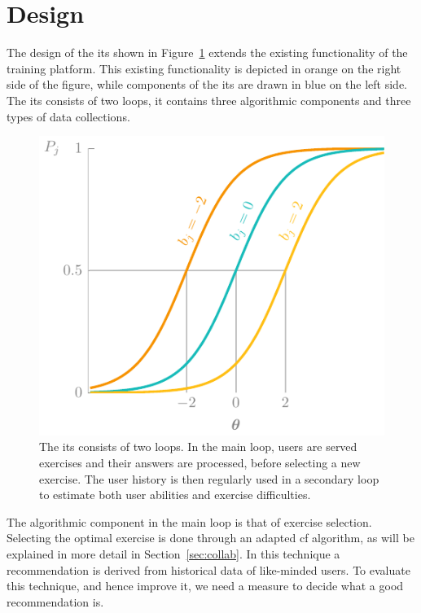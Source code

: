 \section{Design}
\label{sec:design}
The design of the \gls{its} shown in Figure~\ref{fig:its-overview} extends the existing functionality of the training platform.
This existing functionality is depicted in orange on the right side of the figure, while components of the \gls{its} are drawn in blue on the left side.
The \gls{its} consists of two loops, it contains three algorithmic components and three types of data collections.

\begin{figure}
    \centering
    \includegraphics[page=12]{03-education/figures/tikzfigures.pdf}
  \caption[Design of the ITS]{The \Gls{its} consists of two loops. In the main loop, users are served exercises and their answers are processed, before selecting a new exercise. The user history is then regularly used in a secondary loop to estimate both user abilities and exercise difficulties.}
  \label{fig:its-overview} 
\end{figure}

The algorithmic component in the main loop is that of exercise selection.
Selecting the optimal exercise is done through an adapted \gls{cf} algorithm, as will be explained in more detail in Section~\ref{sec:collab}.
In this technique a recommendation is derived from historical data of like-minded users.
To evaluate this technique, and hence improve it, we need a measure to decide what a good recommendation is.

